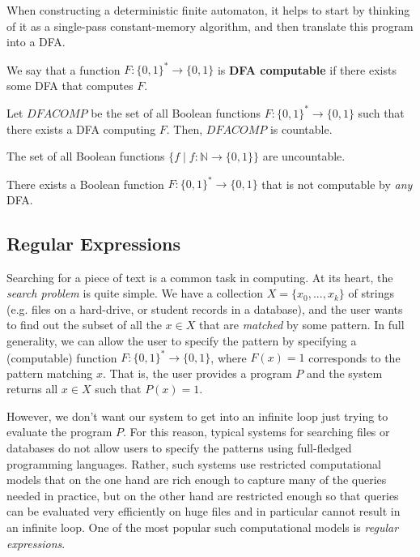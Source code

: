   When constructing a deterministic finite automaton, it helps to start by thinking of it as a single-pass constant-memory algorithm, and then translate this program into a DFA. 

  \begin{definition}
  We say that a function $F: \{0,1\}^* \longrightarrow \{0,1\}$ is \textbf{DFA computable} if there exists some DFA that computes $F$. 
  \end{definition}

  \begin{theorem}
  Let $DFACOMP$ be the set of all Boolean functions $F: \{0,1\}^* \longrightarrow \{0,1\}$ such that there exists a DFA computing $F$. Then, $DFACOMP$ is countable. 
  \end{theorem}

  \begin{lemma}
  The set of all Boolean functions $\{f\;|\; f: \mathbb{N} \longrightarrow \{0,1\}\}$ are uncountable. 
  \end{lemma}

  \begin{corollary}
  There exists a Boolean function $F: \{0,1\}^* \longrightarrow \{0,1\}$ that is not computable by \textit{any} DFA. 
  \end{corollary}

\subsection{Regular Expressions}

  Searching for a piece of text is a common task in computing. At its heart, the \textit{search problem} is quite simple. We have a collection $X = \{x_0, ..., x_k\}$ of strings (e.g. files on a hard-drive, or student records in a database), and the user wants to find out the subset of all the $x \in X$ that are \textit{matched} by some pattern. In full generality, we can allow the user to specify the pattern by specifying a (computable) function $F: \{0,1\}^* \longrightarrow \{0,1\}$, where $F(x) = 1$ corresponds to the pattern matching $x$. That is, the user provides a program $P$ and the system returns all $x \in X$ such that $P(x) = 1$. 

  However, we don’t want our system to get into an infinite loop just trying to evaluate the program $P$. For this reason, typical systems for searching files or databases do not allow users to specify the patterns using full-fledged programming languages. Rather, such systems use restricted computational models that on the one hand are rich enough to capture many of the queries needed in practice, but on the other hand are restricted enough so that queries can be evaluated very efficiently on huge files and in particular cannot result in an infinite loop. One of the most popular such computational models is \textit{regular expressions}. 

